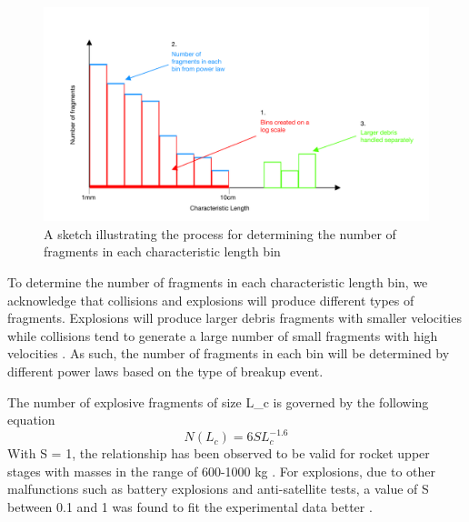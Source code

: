 \documentclass[a4paper, 12pt]{article}
\begin{document}
\begin{figure}[H]
	\centering
	\includegraphics[scale=0.6]{char_len_diagram}
	\caption{A sketch illustrating the process for determining the number of fragments in each characteristic length bin}
	\label{bins_sketch}
\end{figure}

To determine the number of fragments in each characteristic length bin, we acknowledge that collisions and explosions will produce different types of fragments. Explosions will produce larger debris fragments with smaller velocities while collisions tend to generate a large number of small fragments with high velocities \citep{barrows_evolution_1996}.  As such, the number of fragments in each bin will be determined by different power laws based on the type of breakup event.
 
The number of explosive fragments of size \Gls{L_c} is governed by the following equation
\begin{equation}
	N(L_c) =6 S L_c^{-1.6}
\end{equation}
With S = 1, the relationship has been observed to be valid for rocket upper stages with masses in the range of 600-1000 kg \citep{johnson_nasas_2001}. For explosions, due to other malfunctions such as battery explosions and anti-satellite tests, a value of S between 0.1 and 1 was found to fit the experimental data better \citep{krisko_proper_2011}.
\end{document}
